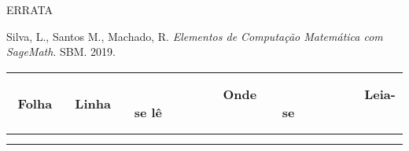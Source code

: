 \documentclass[12pt,a4paper]{report}
\begin{document}
\thispagestyle{empty}







\begin{center}
ERRATA 
\end{center}

\noindent
Silva, L., Santos M., Machado, R. \textit{Elementos de Computação Matemática com SageMath}. SBM. 2019.



\vspace{1cm}

\centering
\begin{tabular}{|c|c|c|c|}
\hline
 ~~ Folha ~~ & ~~ Linha ~~ & ~~~~~~~~~~~~ Onde se lê ~~~~~~~~~~~~ & ~~~~~~~~~~~~ Leia-se ~~~~~~~~~~~~ \\
\hline \hline
 & & & \\ \hline
 & & & \\ \hline

\end{tabular}


% 
% 
% 
% 
% 
\end{document}
